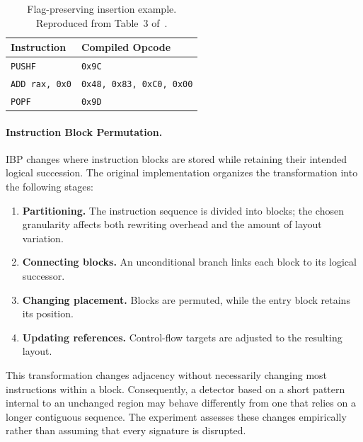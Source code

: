 \documentclass[runningheads]{llncs}
\begin{document}
\begin{table}[htbp]
    \centering
    \caption{Flag-preserving insertion example. Reproduced from Table~3 of~\cite{zone_secrypt_2026}.}
    \label{tab:flag_preserving_nop}
    \small
    \centering
    \setlength{\tabcolsep}{3pt}
    \begin{tabular}{ll}
        \hline
        \textbf{Instruction}    & \textbf{Compiled Opcode} \\ \hline
        \verb|PUSHF|             & \verb|0x9C|                \\ \hline
        \verb|ADD rax, 0x0|      & \verb|0x48, 0x83, 0xC0, 0x00| \\ \hline
        \verb|POPF|              & \verb|0x9D|                \\ \hline
    \end{tabular}
\end{table}

\paragraph{Instruction Block Permutation.}
IBP changes where instruction blocks are stored while retaining their intended logical succession. The original implementation organizes the transformation into the following stages:

\begin{enumerate}
\item \textbf{Partitioning.} The instruction sequence is divided into blocks; the chosen granularity affects both rewriting overhead and the amount of layout variation.
    \item \textbf{Connecting blocks.} An unconditional branch links each block to its logical successor.
    \item \textbf{Changing placement.} Blocks are permuted, while the entry block retains its position.
    \item \textbf{Updating references.} Control-flow targets are adjusted to the resulting layout.

\end{enumerate}

This transformation changes adjacency without necessarily changing most instructions within a block. Consequently, a detector based on a short pattern internal to an unchanged region may behave differently from one that relies on a longer contiguous sequence. The experiment assesses these changes empirically rather than assuming that every signature is disrupted.
\end{document}
